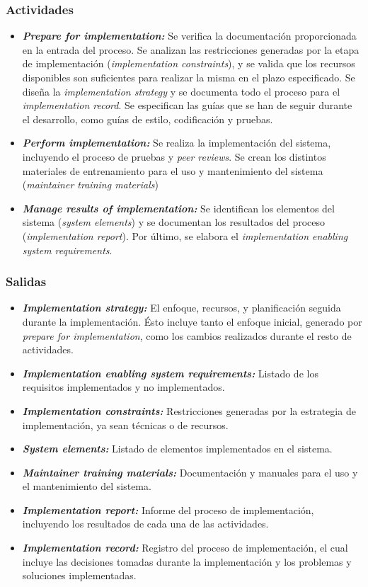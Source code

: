 \subsubsection{Actividades}
\begin{itemize}
  \item \textbf{\textit{Prepare for implementation:}} Se verifica la documentación proporcionada en la entrada del proceso. Se analizan las restricciones generadas por la etapa de implementación (\textit{implementation constraints}), y se valida que los recursos disponibles son suficientes para realizar la misma en el plazo especificado. Se diseña la \textit{implementation strategy} y se documenta todo el proceso para el \textit{implementation record}. Se especifican las guías que se han de seguir durante el desarrollo, como guías de estilo, codificación y pruebas.
  \item \textbf{\textit{Perform implementation:}} Se realiza la implementación del sistema, incluyendo el proceso de pruebas y \textit{peer reviews}. Se crean los distintos materiales de entrenamiento para el uso y mantenimiento del sistema (\textit{maintainer training materials})
  \item \textbf{\textit{Manage results of implementation:}} Se identifican los elementos del sistema (\textit{system elements}) y se documentan los resultados del proceso (\textit{implementation report}). Por último, se elabora el \textit{implementation enabling system requirements}.
\end{itemize}

\subsubsection{Salidas}
\begin{itemize}
  \item \textbf{\textit{Implementation strategy:}} El enfoque, recursos, y planificación seguida durante la implementación. Ésto incluye tanto el enfoque inicial, generado por \textit{prepare for implementation}, como los cambios realizados durante el resto de actividades.
  \item \textbf{\textit{Implementation enabling system requirements:}} Listado de los requisitos implementados y no implementados.
  \item \textbf{\textit{Implementation constraints:}} Restricciones generadas por la estrategia de implementación, ya sean técnicas o de recursos.
  \item \textbf{\textit{System elements:}} Listado de elementos implementados en el sistema.
  \item \textbf{\textit{Maintainer training materials:}} Documentación y manuales para el uso y el mantenimiento del sistema.
  \item \textbf{\textit{Implementation report:}} Informe del proceso de implementación, incluyendo los resultados de cada una de las actividades.
  \item \textbf{\textit{Implementation record:}} Registro del proceso de implementación, el cual incluye las decisiones tomadas durante la implementación y los problemas y soluciones implementadas.
\end{itemize}


